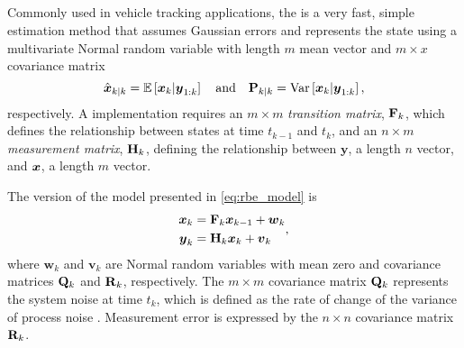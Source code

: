 \subsection{\kf{}}
\label{sec:kf}

Commonly used in vehicle tracking applications, the \kf{} is a very fast, simple estimation method \citep{Anderson_1979} that assumes Gaussian errors and represents the state using a multivariate Normal random variable with length $m$ mean vector and $m\times x$ covariance matrix
\begin{equation}
\label{eq:kf_estimators}
\hat{\boldsymbol x}_{k|k} = \mathbb{E}\left[\boldsymbol x_k | \boldsymbol{y}_{1:k}\right]
\quad\text{and}\quad
\mathbf{P}_{k|k} = \mathrm{Var}\left[\boldsymbol x_k | \boldsymbol{y}_{1:k}\right],
\end{equation}
respectively. A \kf{} implementation requires an $m\times m$ \emph{transition matrix}, $\mathbf{F}_k$, which defines the relationship between states at time $t_{k-1}$ and $t_k$, and an $n\times m$ \emph{measurement matrix}, $\mathbf{H}_k$, defining the relationship between $\boldsymbol{y}$, a length $n$ vector, and $\boldsymbol x$, a length $m$ vector.


The \kf{} version of the model presented in \cref{eq:rbe_model} is
\begin{equation}
\label{eq:kf_model}
\begin{split}
\boldsymbol x_k &= \mathbf{F}_k\boldsymbol x_{k-1} + \boldsymbol{w}_k \\
\boldsymbol{y}_k &= \mathbf{H}_k\boldsymbol x_k + \boldsymbol{v}_k
\end{split},
\end{equation}
where $\boldsymbol{w}_k$ and $\boldsymbol{v}_k$ are Normal random variables with mean zero and covariance matrices $\mathbf{Q}_k$ and $\mathbf{R}_k$, respectively. The $m\times m$ covariance matrix $\mathbf{Q}_k$ represents the system noise at time $t_k$, which is defined as the rate of change of the variance of process noise \citep{Cathey_2003}. Measurement error is expressed by the $n\times n$ covariance matrix $\mathbf{R}_k$.

